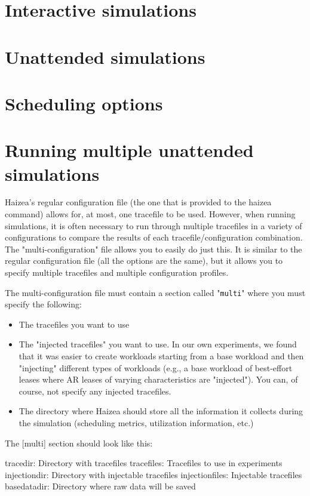 
\section{Interactive simulations}

\section{Unattended simulations}

\section{Scheduling options}

\section{Running multiple unattended simulations}
\label{sec:multiplesim}
Haizea's regular configuration file (the one that is provided to the haizea command) allows for, at most, one tracefile to be used. However, when running simulations, it is often necessary to run through multiple tracefiles in a variety of configurations to compare the results of each tracefile/configuration combination. The "multi-configuration" file allows you to easily do just this. It is similar to the regular configuration file (all the options are the same), but it allows you to specify multiple tracefiles and multiple configuration profiles.

The multi-configuration file must contain a section called "\texttt{multi}" where you must specify the following:

\begin{itemize}
\item The tracefiles you want to use
\item The "injected tracefiles" you want to use. In our own experiments, we found that it was easier to create workloads starting from a base workload and then "injecting" different types of workloads (e.g., a base workload of best-effort leases where AR leases of varying characteristics are "injected"). You can, of course, not specify any injected tracefiles.
\item The directory where Haizea should store all the information it collects during the simulation (scheduling metrics, utilization information, etc.)
\end{itemize}

The [multi] section should look like this:

\begin{wideshellverbatim}
[multi]
tracedir: Directory with tracefiles
tracefiles: Tracefiles to use in experiments
injectiondir: Directory with injectable tracefiles
injectionfiles: Injectable tracefiles
basedatadir: Directory where raw data will be saved
\end{wideshellverbatim}

